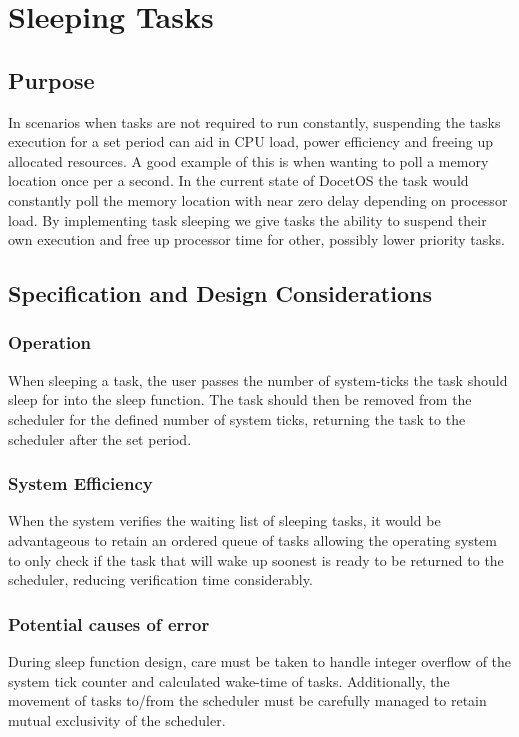 \section{Sleeping Tasks}
\subsection{Purpose}
In scenarios when tasks are not required to run constantly, suspending the tasks execution for a set period can aid in CPU load, power efficiency and freeing up allocated resources. A good example of this is when wanting to poll a memory location once per a second. In the current state of DocetOS the task would constantly poll the memory location with near zero delay depending on processor load. By implementing task sleeping we give tasks the ability to suspend their own execution and free up processor time for other, possibly lower priority tasks.

\subsection{Specification and Design Considerations}
\subsubsection{Operation}
When sleeping a task, the user passes the number of system-ticks the task should sleep for into the sleep function. The task should then be removed from the scheduler for the defined number of system ticks, returning the task to the scheduler after the set period.

\subsubsection{System Efficiency}
When the system verifies the waiting list of sleeping tasks, it would be advantageous to retain an ordered queue of tasks allowing the operating system to only check if the task that will wake up soonest is ready to be returned to the scheduler, reducing verification time considerably.

\subsubsection{Potential causes of error}
During sleep function design, care must be taken to handle integer overflow of the system tick counter and calculated wake-time of tasks. Additionally, the movement of tasks to/from the scheduler must be carefully managed to retain mutual exclusivity of the scheduler.

